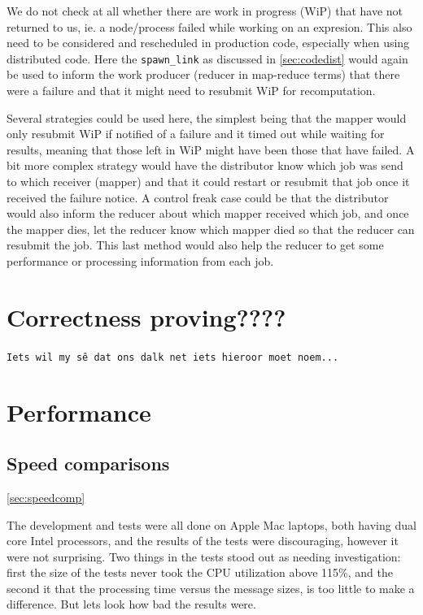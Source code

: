 \documentclass[a4paper,11pt]{report}
\begin{document}
We do not check at all whether there are work in progress (WiP) that
have not returned to us, ie. a node/process failed while working on an
expresion. This also need to be considered and rescheduled in
production code, especially when using distributed code. Here the
\texttt{spawn\_link} as discussed in \ref{sec:codedist} would again be
used to inform the work producer (reducer in map-reduce terms) that
there were a failure and that it might need to resubmit WiP for
recomputation.

Several strategies could be used here, the simplest being that the
mapper would only resubmit WiP if notified of a failure and it timed
out while waiting for results, meaning that those left in WiP might
have been those that have failed. A bit more complex strategy would
have the distributor know which job was send to which receiver
(mapper) and that it could restart or resubmit that job once it
received the failure notice. A control freak case could be that the
distributor would also inform the reducer about which mapper received
which job, and once the mapper dies, let the reducer know which mapper
died so that the reducer can resubmit the job. This last method would
also help the reducer to get some performance or processing
information from each job.

\chapter{Correctness proving????}

\texttt{Iets wil my s\^e dat ons dalk net iets hieroor moet noem...
}

\chapter{Performance}
\section{Speed comparisons}
\ref{sec:speedcomp}

The development and tests were all done on Apple Mac laptops, both
having dual core Intel processors, and the results of the tests were
discouraging, however it were not surprising. Two things in the tests
stood out as needing investigation: first the size of the tests never
took the CPU utilization above 115\%, and the second it that the
processing time versus the message sizes, is too little to make a
difference. But lets look how bad the results were.
\end{document}
